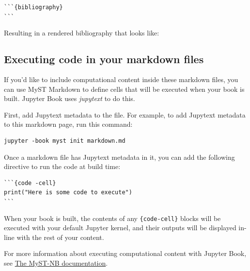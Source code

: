 \documentclass{article}
\begin{document}
\begin{verbatim}
```{bibliography}
```
\end{verbatim}

Resulting in a rendered bibliography that looks like:

% 

\subsection{Executing code in your markdown files}

If you'd like to include computational content inside these markdown files,
you can use MyST Markdown to define cells that will be executed when your
book is built. Jupyter Book uses \textit{jupytext} to do this.

First, add Jupytext metadata to the file. For example, to add Jupytext metadata
to this markdown page, run this command:

\begin{verbatim}
jupyter -book myst init markdown.md
\end{verbatim}

Once a markdown file has Jupytext metadata in it, you can add the following
directive to run the code at build time:

\begin{verbatim}
```{code -cell}
print("Here is some code to execute")
```
\end{verbatim}

When your book is built, the contents of any \texttt{\{code-cell\}} blocks will be
executed with your default Jupyter kernel, and their outputs will be displayed
in-line with the rest of your content.

For more information about executing computational content with Jupyter Book,
see \href{https://myst-nb.readthedocs.io/}{The MyST-NB documentation}.



\end{document}
